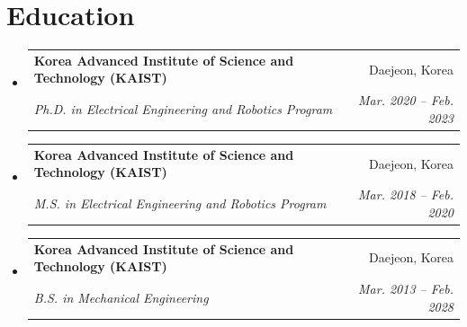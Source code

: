 \documentclass[letterpaper,10pt]{article}
\makeatletter
\newcommand{\resumeSubheading}[4]{
  \vspace{-3pt}\item
    \begin{tabular*}{0.97\textwidth}[t]{l@{\extracolsep{\fill}}r}
      \textbf{#1} & #2 \\
      \textit{\small#3} & \textit{\small #4} \\
    \end{tabular*}\vspace{-9pt}
}
\newcommand{\resumeSubHeadingListStart}{\begin{itemize}[leftmargin=0.15in, label={}]}
\newcommand{\resumeSubHeadingListEnd}{\end{itemize}}
\makeatother
\begin{document}
\section{Education}
  \resumeSubHeadingListStart
    \resumeSubheading
      {Korea Advanced Institute of Science and Technology (KAIST)}{Daejeon, Korea}
      {Ph.D. in Electrical Engineering and Robotics Program}{Mar. 2020 -- Feb. 2023}
    \resumeSubheading
      {Korea Advanced Institute of Science and Technology (KAIST)}{Daejeon, Korea}
      {M.S. in Electrical Engineering and Robotics Program}{Mar. 2018 -- Feb. 2020}
    \resumeSubheading
      {Korea Advanced Institute of Science and Technology (KAIST)}{Daejeon, Korea}
      {B.S. in Mechanical Engineering}{Mar. 2013 -- Feb. 2028}

  \resumeSubHeadingListEnd


\end{document}
